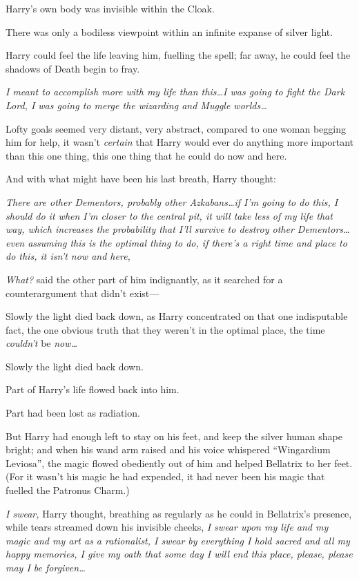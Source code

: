 Harry’s own body was invisible within the Cloak.

There was only a bodiless viewpoint within an infinite expanse of silver light.

Harry could feel the life leaving him, fuelling the spell; far away, he could feel the shadows of Death begin to fray.

\emph{I meant to accomplish more with my life than this…I was going to fight the Dark Lord, I was going to merge the wizarding and Muggle worlds…}

Lofty goals seemed very distant, very abstract, compared to one woman begging him for help, it wasn’t \emph{certain} that Harry would ever do anything more important than this one thing, this one thing that he could do now and here.

And with what might have been his last breath, Harry thought:

\emph{There are other Dementors, probably other Azkabans…if I’m going to do this, I should do it when I’m closer to the central pit, it will take less of my life that way, which increases the probability that I’ll survive to destroy other Dementors…even assuming this is the optimal thing to do, if there’s a right time and place to do this, it isn’t now and here, }

\emph{What?} said the other part of him indignantly, as it searched for a counterargument that didn’t exist—

Slowly the light died back down, as Harry concentrated on that one indisputable fact, the one obvious truth that they weren’t in the optimal place, the time \emph{couldn’t} be \emph{now…}

Slowly the light died back down.

Part of Harry’s life flowed back into him.

Part had been lost as radiation.

But Harry had enough left to stay on his feet, and keep the silver human shape bright; and when his wand arm raised and his voice whispered “Wingardium Leviosa”, the magic flowed obediently out of him and helped Bellatrix to her feet. (For it wasn’t his magic he had expended, it had never been his magic that fuelled the Patronus Charm.)

\emph{I swear,} Harry thought, breathing as regularly as he could in Bellatrix’s presence, while tears streamed down his invisible cheeks, \emph{I swear upon my life and my magic and my art as a rationalist, I swear by everything I hold sacred and all my happy memories, I give my oath that some day I will end this place, please, please may I be forgiven…}

